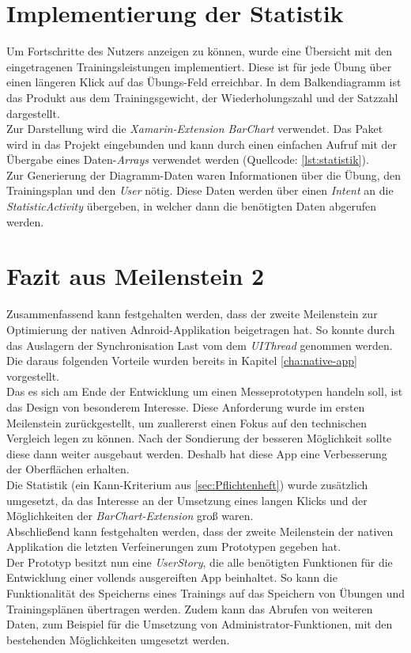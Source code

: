 \section{Implementierung der Statistik}
\label{sec:implementierung-statistik}
Um Fortschritte des Nutzers anzeigen zu können, wurde eine Übersicht mit den eingetragenen Trainingsleistungen implementiert. Diese ist für jede Übung über einen längeren Klick auf das Übungs-Feld erreichbar. In dem Balkendiagramm ist das Produkt aus dem Trainingsgewicht, der Wiederholungszahl und der Satzzahl dargestellt.\\
Zur Darstellung wird die \textit{Xamarin-Extension BarChart} verwendet. Das Paket wird in das Projekt eingebunden und kann durch einen einfachen Aufruf mit der Übergabe eines Daten-\textit{Arrays} verwendet werden (Quellcode: \ref{lst:statistik}).\\
Zur Generierung der Diagramm-Daten waren Informationen über die Übung, den Trainingsplan und den \textit{User} nötig. Diese Daten werden über einen \textit{Intent} an die \textit{StatisticActivity} übergeben, in welcher dann die benötigten Daten abgerufen werden.


\section{Fazit aus Meilenstein 2}
\label{sec:fazit-meilenstein-2}
Zusammenfassend kann festgehalten werden, dass der zweite Meilenstein zur Optimierung der nativen Adnroid-Applikation beigetragen hat. So konnte durch das Auslagern der Synchronisation Last vom dem \textit{UIThread} genommen werden. Die daraus folgenden Vorteile wurden bereits in Kapitel \ref{cha:native-app} vorgestellt.\\
Das es sich am Ende der Entwicklung um einen Messeprototypen handeln soll, ist das Design von besonderem Interesse. Diese Anforderung wurde im ersten Meilenstein zurückgestellt, um zuallererst einen Fokus auf den technischen Vergleich legen zu können. Nach der Sondierung der besseren Möglichkeit sollte diese dann weiter ausgebaut werden. Deshalb hat diese App eine Verbesserung der Oberflächen erhalten.\\
Die Statistik (ein Kann-Kriterium aus \ref{sec:Pflichtenheft}) wurde zusätzlich umgesetzt, da das Interesse an der Umsetzung eines langen Klicks und der Möglichkeiten der \textit{BarChart-Extension} groß waren.\\
Abschließend kann festgehalten werden, dass der zweite Meilenstein der nativen Applikation die letzten Verfeinerungen zum Prototypen gegeben hat.\\
Der Prototyp besitzt nun eine \textit{UserStory}, die alle benötigten Funktionen für die Entwicklung einer vollends ausgereiften App beinhaltet. So kann die Funktionalität des Speicherns eines Trainings auf das Speichern von Übungen und Trainingsplänen übertragen werden. Zudem kann das Abrufen von weiteren Daten, zum Beispiel für die Umsetzung von Administrator-Funktionen, mit den bestehenden Möglichkeiten umgesetzt werden.

